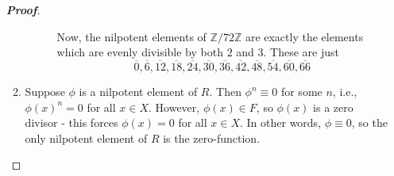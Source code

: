 \documentclass[12pt,leqno]{book}
\theoremstyle{definition}
\newcommand{\Z}{\mathbb{Z}}
\newenvironment{Proof}{\begin{proof}[\textnormal{\textbf{Proof}}]}{\end{proof}}
\begin{document}
\begin{enumerate}
\begin{Proof}
\begin{enumerate}
\begin{description}
Now, the nilpotent elements of $\Z/72\Z$ are exactly the elements which are evenly divisible by both $2$ and $3$. These are just \[\overline{0},\overline{6},\overline{12},\overline{18},\overline{24},\overline{30},\overline{36},\overline{42},\overline{48},\overline{54},\overline{60},\overline{66}\]
        \end{description}
  \item Suppose $\phi$ is a nilpotent element of $R$. Then $\phi^{n}\equiv0$ for some $n$, i.e., $\phi(x)^n=0$ for all $x\in X$. However, $\phi(x)\in F$, so $\phi(x)$ is a zero divisor - this forces $\phi(x)=0$ for all $x\in X$. In other words, $\phi\equiv0$, so the only nilpotent element of $R$ is the zero-function.
 \end{enumerate}
\end{Proof}

\end{enumerate}
\end{document}
